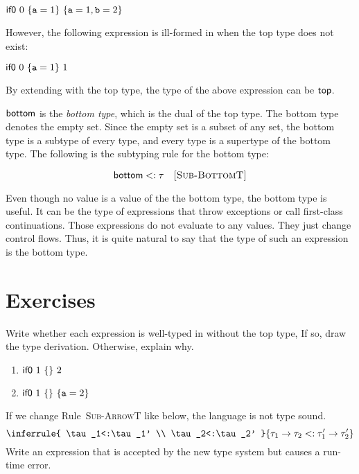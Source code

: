 $\textsf{if0}\ 0\ \{\texttt{a}=1\}\ \{\texttt{a}=1,\texttt{b}=2\}$

However, the following expression is ill-formed in \lang when the top type does
not exist:

$\textsf{if0}\ 0\ \{\texttt{a}=1\}\ 1$

By extending \lang with the top type, the type of the above expression can be
$\textsf{top}$.

$\textsf{bottom}$ is the \textit{bottom type}, which is the dual of
the top type. The bottom type denotes the empty set. Since the empty set is a subset of
any set, the bottom type is a subtype of every type, and
every type is a supertype of the bottom type. The following is the subtyping rule
for the bottom type:


\[
  \textsf{bottom}<:\tau
  \quad\textsc{[Sub-BottomT]}
\]

Even though no value is a value of the the bottom type,
the bottom type is useful. It can be the type of
expressions that throw exceptions or call first-class continuations. Those
expressions do not evaluate to any values. They just change control flows.
Thus, it is quite natural to say that the type of such an expression
is the bottom type.

\section{Exercises}

\begin{exercise}

Write whether each expression is well-typed in \lang without the top type,
If so, draw the type derivation. Otherwise, explain why.
\begin{enumerate}
\item $\textsf{if0}\ 1\ \{ \}\ 2$
\item $\textsf{if0}\ 1\ \{ \}\ \{\texttt{a}=2\}$
\end{enumerate}

\end{exercise}

\begin{exercise}

If we change Rule~\textsc{Sub-ArrowT} like below, the language is not type
  sound.
  \[
    \inferrule
    { \tau_1<:\tau_1' \\ \tau_2<:\tau_2' }
    { \tau_1\rightarrow\tau_2<:\tau_1'\rightarrow\tau_2' }
  \]
Write an expression that is accepted by the new type system but
causes a run-time error.

\end{exercise}

